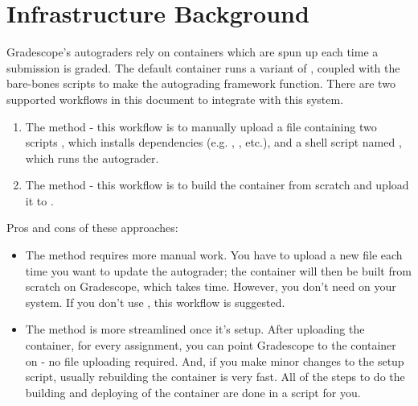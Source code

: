 \documentclass[11pt]{report}
\begin{document}
\section*{Infrastructure Background}
Gradescope's autograders rely on  containers which are spun up each time 
a submission is graded. The default container runs a variant of ,
coupled with the bare-bones scripts to make the autograding framework function. There are two 
supported workflows in this document to integrate with this system. 
\begin{enumerate}
      \item The  method - this workflow is to manually upload a  file 
      containing two scripts , which installs dependencies (e.g. , 
      , etc.), and a shell script named , which runs the autograder.
      \item The  method - this workflow is to build the  container from
      scratch and upload it to .
\end{enumerate}
Pros and cons of these approaches:
\begin{itemize}
      \item The  method requires more manual work. You have to upload
      a new  file each time you want to update the autograder; the  container 
      will then be built from scratch on Gradescope, which takes time. However, you don't need 
       on your system. If you don't use , this workflow is suggested. 
      \item The  method is more streamlined once it's setup. After uploading the container, 
      for every assignment, you can point Gradescope to the container on  - no 
       file uploading required. And, if you make minor changes to the setup script, 
      usually rebuilding the container is very fast. All of the steps to do the building and deploying 
      of the container are done in a script for you. 
\end{itemize}
\end{document}
